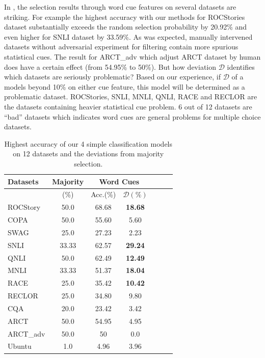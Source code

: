 In , the selection
results through word cue features on several datasets are striking.
For example the highest accuracy with our methods for ROCStories dataset 
substantially exceeds the random selection probability by 20.92\% and even higher  for SNLI dataset 
by 33.59\%.  As was expected, 
manually intervened datasets without adversarial experiment 
for filtering contain more spurious statistical cues. 
The result for ARCT\_adv which adjust ARCT dataset by human does have a certain effect (from 54.95\% to 50\%).
But how deviation $\mathcal{D}$ identifies which datasets are seriously problematic? 
Based on our experience, if $\mathcal{D}$ of a models beyond 10\% on either cue feature, this model will be 
determined as a problematic dataset.
ROCStories, SNLI, MNLI, QNLI, RACE and RECLOR are the datasets containing heavier
statistical cue problem. 6 out of 12 datasets are ``bad'' datasets which 
indicates word 
cues are general problems for multiple choice datasets. 

\begin{table}[th]
\small
\centering
\begin{tabular}{lcccccc}\hline
\textbf{Datasets} &Majority & \multicolumn{2}{c}{Word Cues}  \\ \hline
                                     & (\%)                 &  Acc.(\%) & $\mathcal{D}(\%)$ \\ \hline         
ROCStory & 50.0            & 68.68          & \textbf{18.68}   \\
COPA        & 50.0           & 55.60           &  5.60                \\
SWAG       & 25.0           & 27.23           &   2.23                \\
SNLI          & 33.33      & 62.57           &  \textbf{29.24}      \\
QNLI         & 50.0           & 62.49            &  \textbf{12.49}   \\
MNLI         & 33.33      & 51.37            &\textbf{18.04}        \\
RACE        & 25.0          & 35.42            &   \textbf{10.42}   \\
RECLOR       & 25.0           & 34.80            &   9.80   \\
CQA          &20.0            & 23.42            &  3.42      \\
ARCT        & 50.0            & 54.95           &  4.95      \\
ARCT\_adv& 50.0           &50                 &0.0      \\
Ubuntu   & 1.0               &4.96              &3.96      \\
\hline
\end{tabular}
\caption{\label{best_acc} Highest accuracy of our 4 simple classification models
on 12 datasets and the deviations from majority selection.}
\end{table}

